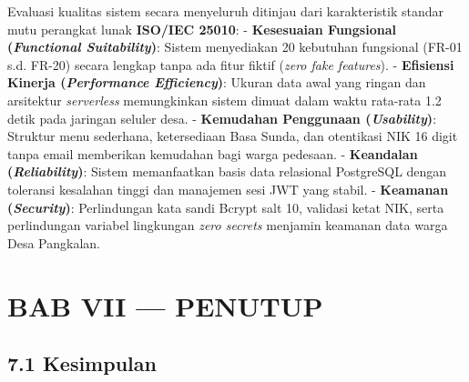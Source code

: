 \documentclass[
  indonesian,
  12pt,
]{report}
\begin{document}
Evaluasi kualitas sistem secara menyeluruh ditinjau dari karakteristik
standar mutu perangkat lunak \textbf{ISO/IEC 25010}: -
\textbf{Kesesuaian Fungsional (\emph{Functional Suitability})}: Sistem
menyediakan 20 kebutuhan fungsional (FR-01 s.d. FR-20) secara lengkap
tanpa ada fitur fiktif (\emph{zero fake features}). - \textbf{Efisiensi
Kinerja (\emph{Performance Efficiency})}: Ukuran data awal yang ringan
dan arsitektur \emph{serverless} memungkinkan sistem dimuat dalam waktu
rata-rata 1.2 detik pada jaringan seluler desa. - \textbf{Kemudahan
Penggunaan (\emph{Usability})}: Struktur menu sederhana, ketersediaan
Basa Sunda, dan otentikasi NIK 16 digit tanpa email memberikan kemudahan
bagi warga pedesaan. - \textbf{Keandalan (\emph{Reliability})}: Sistem
memanfaatkan basis data relasional PostgreSQL dengan toleransi kesalahan
tinggi dan manajemen sesi JWT yang stabil. - \textbf{Keamanan
(\emph{Security})}: Perlindungan kata sandi Bcrypt salt 10, validasi
ketat NIK, serta perlindungan variabel lingkungan \emph{zero secrets}
menjamin keamanan data warga Desa Pangkalan.

\newpage

\chapter{BAB VII --- PENUTUP}\label{bab-vii-penutup}

\section{7.1 Kesimpulan}\label{kesimpulan}
\end{document}
